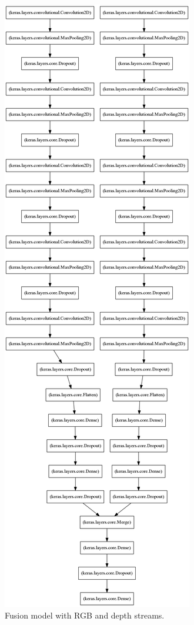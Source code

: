 \documentclass[paper=letter, fontsize=12pt]{article}
\begin{document}
\begin{figure}[htbp]
\centering
\includegraphics[width=.42\textwidth]{fusion_model}
\caption{Fusion model with RGB and depth streams.}
\label{fig:fusion_model}
\end{figure}
\end{document}
